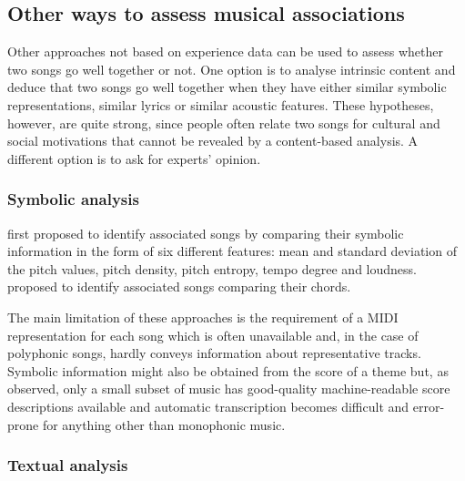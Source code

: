 
\subsection{Other ways to assess musical associations} %
\label{sub:other_ways_to_assess_musical_associations}

Other approaches not based on experience data can be used to assess whether two songs go well together or not. 
%
One option is to analyse intrinsic content and deduce that two songs go well together when they have either similar symbolic representations, similar lyrics or similar acoustic features.
These hypotheses, however, are quite strong, since people often relate two songs for cultural and social motivations that cannot be revealed by a content-based analysis.
A different option is to ask for experts' opinion. 

\subsubsection{Symbolic analysis} %
\label{ssub:signal_analysis}

\citet{Chen01} first proposed to identify associated songs by comparing their symbolic information in the form of six different features: mean and standard deviation of the pitch values, pitch density, pitch entropy, tempo degree and loudness.
\citet{Kuo02} proposed to identify associated songs comparing their chords.

The main limitation of these approaches is the requirement of a MIDI \cite{MIDI96} representation for each song which is often unavailable and, in the case of polyphonic songs, hardly conveys information about representative tracks.
Symbolic information might also be obtained from the score of a theme but, as \citet{Logan03} observed, only a small subset of music has good-quality machine-readable score descriptions available and automatic transcription becomes difficult and error-prone for anything other than monophonic music.


\subsubsection{Textual analysis} %
\label{ssub:lyrics_analysis}

